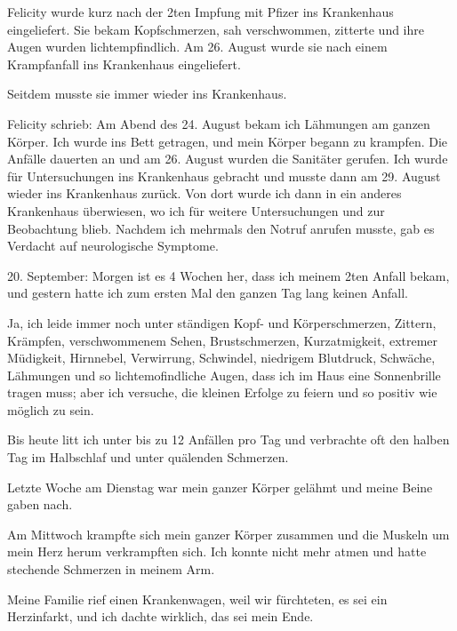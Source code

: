 Felicity wurde kurz nach der 2ten Impfung mit Pfizer ins Krankenhaus
eingeliefert. Sie bekam Kopfschmerzen, sah verschwommen, zitterte und ihre Augen
wurden lichtempfindlich. Am 26. August wurde sie nach einem Krampfanfall ins
Krankenhaus eingeliefert.

Seitdem musste sie immer wieder ins Krankenhaus.

Felicity schrieb: Am Abend des 24. August bekam ich Lähmungen am ganzen
Körper. Ich wurde ins Bett getragen, und mein Körper begann zu krampfen. Die
Anfälle dauerten an und am 26. August wurden die Sanitäter gerufen. Ich wurde
für Untersuchungen ins Krankenhaus gebracht und musste dann am 29. August wieder
ins Krankenhaus zurück. Von dort wurde ich dann in ein anderes Krankenhaus
überwiesen, wo ich für weitere Untersuchungen und zur Beobachtung blieb. Nachdem
ich mehrmals den Notruf anrufen musste, gab es Verdacht auf neurologische
Symptome.

20. September: Morgen ist es 4 Wochen her, dass ich meinem 2ten Anfall bekam,
und gestern hatte ich zum ersten Mal den ganzen Tag lang keinen Anfall.

Ja, ich leide immer noch unter ständigen Kopf- und Körperschmerzen, Zittern,
Krämpfen, verschwommenem Sehen, Brustschmerzen, Kurzatmigkeit, extremer
Müdigkeit, Hirnnebel, Verwirrung, Schwindel, niedrigem Blutdruck, Schwäche,
Lähmungen und so lichtemofindliche Augen, dass ich im Haus eine Sonnenbrille
tragen muss; aber ich versuche, die kleinen Erfolge zu feiern und so positiv wie
möglich zu sein.

Bis heute litt ich unter bis zu 12 Anfällen pro Tag und verbrachte oft den
halben Tag im Halbschlaf und unter quälenden Schmerzen.

Letzte Woche am Dienstag war mein ganzer Körper gelähmt und meine Beine gaben
nach.

Am Mittwoch krampfte sich mein ganzer Körper zusammen und die Muskeln um mein
Herz herum verkrampften sich. Ich konnte nicht mehr atmen und hatte stechende
Schmerzen in meinem Arm.

Meine Familie rief einen Krankenwagen, weil wir fürchteten, es sei ein
Herzinfarkt, und ich dachte wirklich, das sei mein Ende.
